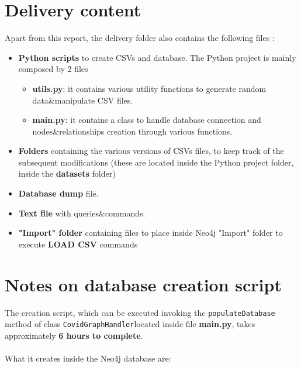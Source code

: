 \documentclass{article}[IEEEtran]
\begin{document}
\section{Delivery content}
Apart from this report, the delivery folder also contains the following files :
\begin{itemize}
    \item \textbf{Python scripts} to create CSVs and database. The Python project is mainly composed by 2 files
    \begin{itemize}
        \item \textbf{utils.py}: it contains various utility functions to generate random data\&manipulate CSV files.
        \item \textbf{main.py}: it contains a class to handle database connection and nodes\&relationships creation through various functions.
    \end{itemize}
    \item \textbf{Folders} containing the various versions of CSVs files, to keep track of the subsequent modifications (these are located inside the Python project folder, inside the \textbf{datasets} folder)
    \item \textbf{Database dump} file.
    \item \textbf{Text file} with queries\&commands.
    \item \textbf{"Import" folder} containing files to place inside Neo4j "Import" folder to execute \textbf{LOAD CSV} commands 
\end{itemize}

\newpage

\section{Notes on database creation script}

The creation script, which can be executed invoking the \lstinline{populateDatabase} method of class \lstinline{CovidGraphHandler}located inside file \textbf{main.py}, takes approximately \textbf{6 hours to complete}. \\\\
What it creates inside the Neo4j database are:
\end{document}
